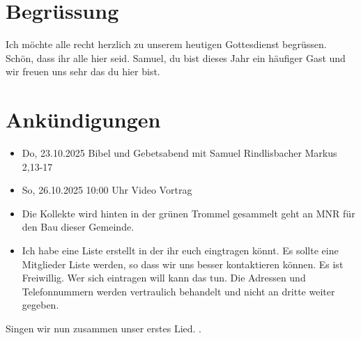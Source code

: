\documentclass{../../inc/mybib}
\begin{document}
\section{Begrüssung}
Ich möchte alle recht herzlich zu unserem heutigen Gottesdienst begrüssen. Schön, dass ihr alle hier seid. Samuel, du bist dieses Jahr ein häufiger Gast und wir freuen uns sehr das du hier bist.

\beten{}

\section{Ankündigungen}
\begin{itemize}
    \item {} Do,  23.10.2025 Bibel und Gebetsabend mit Samuel Rindlisbacher Markus 2,13-17
    \item {} So, 26.10.2025 10:00 Uhr Video Vortrag    
    \item Die Kollekte wird hinten in der grünen Trommel gesammelt geht an MNR für den Bau dieser Gemeinde.    
    \item Ich habe eine Liste erstellt in der ihr euch eingtragen könnt. Es sollte eine Mitglieder Liste werden, so dass wir uns besser kontaktieren können. Es ist Freiwillig. Wer sich eintragen will kann das tun. Die Adressen und Telefonnummern werden vertraulich behandelt und nicht an dritte weiter gegeben.
\end{itemize}

Singen wir nun zusammen unser erstes Lied.
{}.
\end{document}
